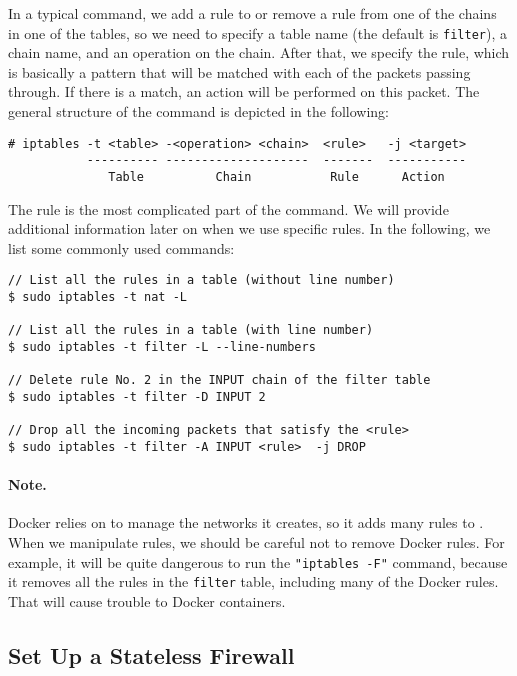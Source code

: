 In a typical \iptables command, we add a rule to or remove a rule 
from one of the chains in one of the tables, so we need to 
specify a table name (the default is \texttt{filter}), a chain name, 
and an operation on the chain. After that, we specify the rule, which
is basically a pattern that will be matched with each of the 
packets passing through. If there is a match, an action will be 
performed on this packet. 
The general structure of the command is depicted in the following:

\begin{lstlisting}
# iptables -t <table> -<operation> <chain>  <rule>   -j <target>
           ---------- --------------------  -------  -----------
              Table          Chain           Rule      Action
\end{lstlisting}


The rule is the most complicated part of the \iptables command. 
We will provide additional information later on when we use 
specific rules. In the following, we list some commonly 
used commands: 


\begin{lstlisting}
// List all the rules in a table (without line number)
$ sudo iptables -t nat -L

// List all the rules in a table (with line number)
$ sudo iptables -t filter -L --line-numbers

// Delete rule No. 2 in the INPUT chain of the filter table 
$ sudo iptables -t filter -D INPUT 2

// Drop all the incoming packets that satisfy the <rule>
$ sudo iptables -t filter -A INPUT <rule>  -j DROP
\end{lstlisting}


\paragraph{Note.} Docker relies on \iptables to manage 
the networks it creates, so it adds many rules to \iptables.
When we manipulate \iptables rules, we should be careful 
not to remove Docker rules. For example, it will be quite
dangerous to run the \texttt{"iptables -F"} command, because 
it removes all the rules in the \texttt{filter} table,
including many of the Docker rules. That will cause 
trouble to Docker containers. 


\subsection{Set Up a Stateless Firewall}

